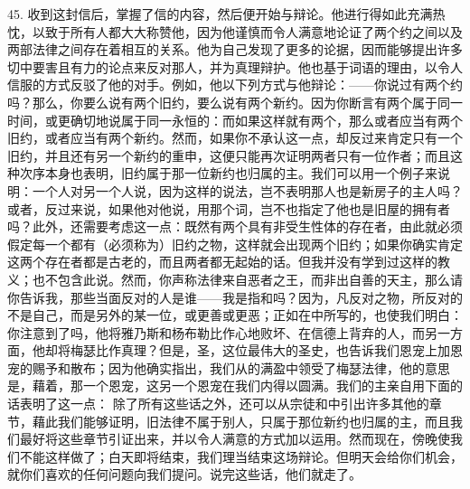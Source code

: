 45. 收到这封信后，掌握了信的内容，然后便开始与辩论。他进行得如此充满热忱，以致于所有人都大大称赞他，因为他谨慎而令人满意地论证了两个约之间以及两部法律之间存在着相互的关系。他为自己发现了更多的论据，因而能够提出许多切中要害且有力的论点来反对那人，并为真理辩护。他也基于词语的理由，以令人信服的方式反驳了他的对手。例如，他以下列方式与他辩论：——你说过有两个约吗？那么，你要么说有两个旧约，要么说有两个新约。因为你断言有两个属于同一时间，或更确切地说属于同一永恒的：而如果这样就有两个，那么或者应当有两个旧约，或者应当有两个新约。然而，如果你不承认这一点，却反过来肯定只有一个旧约，并且还有另一个新约的重申，这便只能再次证明两者只有一位作者；而且这种次序本身也表明，旧约属于那一位新约也归属的主。我们可以用一个例子来说明：一个人对另一个人说，因为这样的说法，岂不表明那人也是新房子的主人吗？或者，反过来说，如果他对他说，用那个词，岂不也指定了他也是旧屋的拥有者吗？此外，还需要考虑这一点：既然有两个具有非受生性体的存在者，由此就必须假定每一个都有（必须称为）旧约之物，这样就会出现两个旧约；如果你确实肯定这两个存在者都是古老的，而且两者都无起始的话。但我并没有学到过这样的教义；也不包含此说。然而，你声称法律来自恶者之王，而非出自善的天主，那么请你告诉我，那些当面反对的人是谁——我是指和吗？因为，凡反对之物，所反对的不是自己，而是另外的某一位，或更善或更恶；正如在中所写的，也使我们明白： 你注意到了吗，他将雅乃斯和杨布勒比作心地败坏、在信德上背弃的人，而另一方面，他却将梅瑟比作真理？但是，圣，这位最伟大的圣史，也告诉我们恩宠上加恩宠的赐予和散布；因为他确实指出，我们从的满盈中领受了梅瑟法律，他的意思是，藉着，那一个恩宠，这另一个恩宠在我们内得以圆满。我们的主亲自用下面的话表明了这一点： 除了所有这些话之外，还可以从宗徒和中引出许多其他的章节，藉此我们能够证明，旧法律不属于别人，只属于那位新约也归属的主，而且我们最好将这些章节引证出来，并以令人满意的方式加以运用。然而现在，傍晚使我们不能这样做了；白天即将结束，我们理当结束这场辩论。但明天会给你们机会，就你们喜欢的任何问题向我们提问。说完这些话，他们就走了。\par

